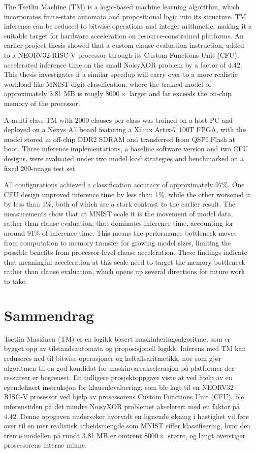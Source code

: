 The Tsetlin Machine (TM) is a logic-based machine learning algorithm, which incorporates finite-state automata and propositional logic into its structure. TM inference can be reduced to bitwise operations and integer arithmetic, making it a suitable target for hardware acceleration on resource-constrained platforms. An earlier project thesis \cite{JB2025} showed that a custom clause evaluation instruction, added to a NEORV32 RISC-V processor through its Custom Functions Unit (CFU), accelerated inference time on the small NoisyXOR problem by a factor of $4.42$. This thesis investigates if a similar speedup will carry over to a more realistic workload like MNIST digit classification, where the trained model of approximately 3.81 MB is rougly $8000\times$ larger and far exceeds the on-chip memory of the processor.

A multi-class TM with 2000 clauses per class was trained on a host PC and deployed  on a Nexys A7 board featuring a Xilinx Artix-7 100T FPGA, with the model stored in off-chip DDR2 SDRAM and transferred from QSPI Flash at boot. Three inference implementations, a baseline software version and two CFU designs, were evaluated under two model load strategies and benchmarked on a fixed 200-image test set.

All configurations achieved a classification accuracy of approximately 97\%. One CFU design improved inference time by less than 1\%, while the other worsened it by less than 1\%, both of which are a stark contrast to the earlier result. The measurements show that at MNIST scale it is the movement of model data, rather than clause evaluation, that dominates inference time, accounting for around 91\% of inference time. This means the performance bottleneck moves from computation to memory transfer for growing model sizes, limiting the possible benefits from processor-level clause acceleration. These findings indicate that meaningful acceleration at this scale need to target the memory bottleneck rather than clause evaluation, which opens up several directions for future work to take.

\newpage
\chapter*{Sammendrag}

Tsetlin Maskinen (TM) er en logikk basert maskinlæringsalgoritme, som er bygget opp av tilstandsautomata og proposisjonell logikk. Inferens med TM kan reduseres ned til bitwise operasjoner og heltallsaritmetikk, noe som gjør algoritmen til en god kandidat for maskinvareakselerasjon på platformer der ressurser er begrenset. En tidligere prosjektoppgave \cite{JB2025} viste at ved hjelp av en egendefinert instruksjon for klausulevaluering, som ble lagt til en NEORV32 RISC-V prosessor ved hjelp av prosessorens Custom Functions Unit (CFU), ble inferenstiden på det mindre NoisyXOR problemet akselerert med en faktor på $4.42$. Denne oppgaven undersøker hvorvidt en lignende økning i hastighet vil føre over til en mer realistisk arbeidsmengde som MNIST siffer klassifisering, hvor den trente modellen på rundt 3.81 MB er omtrent $8000 \times$ større, og langt overstiger prosessorens interne minne.

